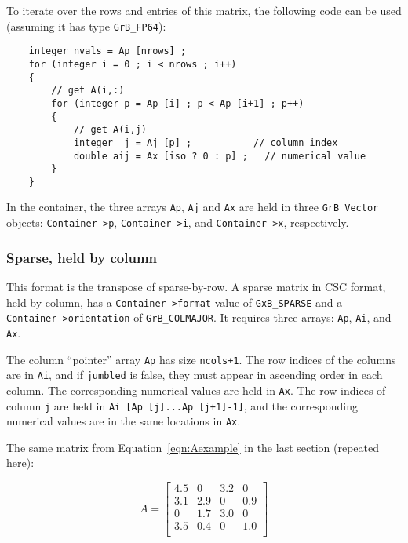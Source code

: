 To iterate over the rows and entries of this matrix, the following code can be
used (assuming it has type \verb'GrB_FP64'):

    {\footnotesize
    \begin{verbatim}
    integer nvals = Ap [nrows] ;
    for (integer i = 0 ; i < nrows ; i++)
    {
        // get A(i,:)
        for (integer p = Ap [i] ; p < Ap [i+1] ; p++)
        {
            // get A(i,j)
            integer  j = Aj [p] ;           // column index
            double aij = Ax [iso ? 0 : p] ;   // numerical value
        }
    } \end{verbatim}}

In the container, the three arrays \verb'Ap', \verb'Aj' and \verb'Ax'
are held in three \verb'GrB_Vector' objects:
\verb'Container->p',
\verb'Container->i', and
\verb'Container->x', respectively.

\subsubsection{Sparse, held by column}
\label{format_sparse_by_col}

This format is the transpose of sparse-by-row.  A sparse matrix in CSC format,
held by column, has a \verb'Container->format' value of \verb'GxB_SPARSE' and a
\verb'Container->orientation' of \verb'GrB_COLMAJOR'.  It requires three
arrays: \verb'Ap', \verb'Ai', and \verb'Ax'.

The column ``pointer'' array \verb'Ap' has size \verb'ncols+1'.  The row
indices of the columns are in \verb'Ai', and if \verb'jumbled' is false,
they must appear in ascending order in
each column.  The corresponding numerical values are held in \verb'Ax'.  The
row indices of column \verb'j' are held in \verb'Ai [Ap [j]...Ap [j+1]-1]',
and the corresponding numerical values are in the same locations in \verb'Ax'.

The same matrix from Equation~\ref{eqn:Aexample} in
the last section (repeated here):

    \begin{equation}
    A = \left[
    \begin{array}{cccc}
    4.5 &   0 & 3.2 &   0 \\
    3.1 & 2.9 &  0  & 0.9 \\
     0  & 1.7 & 3.0 &   0 \\
    3.5 & 0.4 &  0  & 1.0 \\
    \end{array}
    \right]
    \end{equation}

